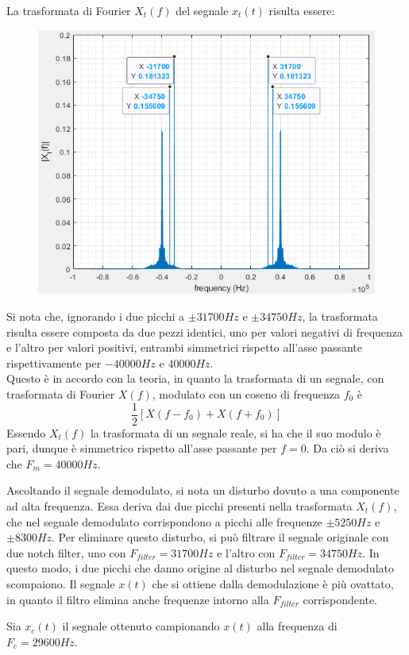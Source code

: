 \documentclass[12pt]{article}
\begin{document}
La trasformata di Fourier $X_{t}(f)$ del segnale $x_{t}(t)$ risulta essere:\par
\begin{figure}[h!]
	\centering
	\includegraphics[width=0.6\linewidth]{./images/X_t.png}
\end{figure}
Si nota che, ignorando i due picchi a $\pm31700Hz$ e $\pm34750Hz$, la trasformata risulta essere composta da due pezzi identici, uno per valori negativi di frequenza e l'altro per valori positivi, entrambi simmetrici rispetto all'asse passante rispettivamente per $-40000Hz$ e $40000Hz$.\\
Questo è in accordo con la teoria, in quanto la trasformata di un segnale, con trasformata di Fourier $X(f)$, modulato con un coseno di frequenza $f_{0}$ è
\begin{equation}
	\frac{1}{2}[X(f - f_{0}) + X(f + f_{0})]
\end{equation}
Essendo $X_{t}(f)$ la trasformata di un segnale reale, si ha che il suo modulo è pari, dunque è simmetrico rispetto all'asse passante per $f=0$. Da ciò si deriva che $F_{m}=40000Hz$.\par
Ascoltando il segnale demodulato, si nota un disturbo dovuto a una componente ad alta frequenza. Essa deriva dai due picchi presenti nella trasformata $X_{t}(f)$, che nel segnale demodulato corrispondono a picchi alle frequenze $\pm5250Hz$ e $\pm8300Hz$. Per eliminare questo disturbo, si può filtrare il segnale originale con due notch filter, uno con $F_{filter} = 31700Hz$ e l'altro con $F_{filter} = 34750Hz$. In questo modo, i due picchi che danno origine al disturbo nel segnale demodulato scompaiono. Il segnale  $x(t)$ che si ottiene dalla demodulazione è più ovattato, in quanto il filtro elimina anche frequenze intorno alla $F_{filter}$ corrispondente.

Sia $x_{c}(t)$ il segnale ottenuto campionando $x(t)$ alla frequenza di $F_{c} = 29600Hz$. 
\end{document}
